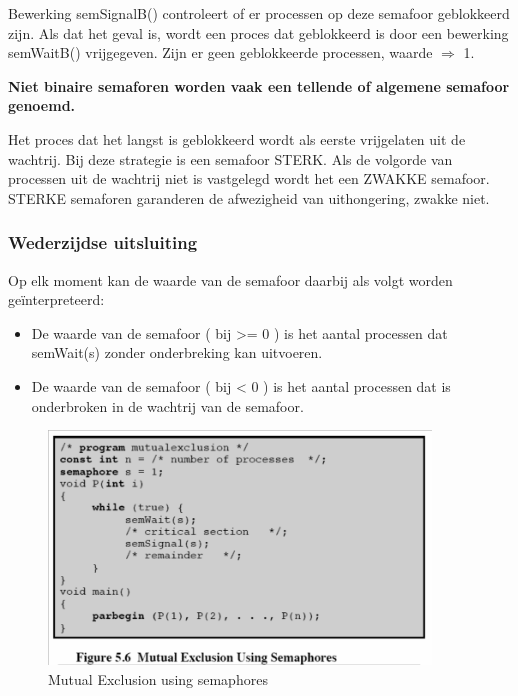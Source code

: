 Bewerking semSignalB() controleert of er processen op deze semafoor geblokkeerd zijn. Als dat het geval is, wordt een proces dat geblokkeerd is door een bewerking semWaitB() vrijgegeven. Zijn er geen geblokkeerde processen, waarde $\Rightarrow$ 1.

\textbf{Niet binaire semaforen worden vaak een tellende of algemene semafoor genoemd.}

Het proces dat het langst is geblokkeerd wordt als eerste vrijgelaten uit de wachtrij. Bij deze strategie is een semafoor STERK. Als de volgorde van processen uit de wachtrij niet is vastgelegd wordt het een ZWAKKE semafoor. STERKE semaforen garanderen de afwezigheid van uithongering, zwakke niet.


\subsubsection{Wederzijdse uitsluiting}

Op elk moment kan de waarde van de semafoor daarbij als volgt worden geïnterpreteerd:

\begin{itemize}
\item De waarde van de semafoor ( bij >= 0 ) is het aantal processen dat semWait(s) zonder onderbreking kan uitvoeren.
\item De waarde van de semafoor ( bij < 0 ) is het aantal processen dat is onderbroken in de wachtrij van de semafoor.
\end{itemize}


\begin{figure}[htp]
    \centering
            \includegraphics[width=4in]{img/mutualexclusionsemafoor.png}
        \caption{Mutual Exclusion using semaphores}
    \label{fig:Mutual Exclusion using semaphores}
\end{figure}

